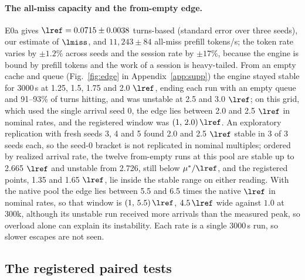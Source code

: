 \paragraph{The all-miss capacity and the from-empty edge.}\label{sec:edge}
E0a gives $\lref=0.0715\pm0.0038$\sps{} turns-based (standard error over three seeds), our estimate of $\lmiss$, and $11{,}243\pm84$ all-miss prefill tokens/s; the token rate varies by $\pm1.2\%$ across seeds and the session rate by $\pm17\%$, because the engine is bound by prefill tokens and the work of a session is heavy-tailed. From an empty cache and queue (Fig.~\ref{fig:edge} in Appendix~\ref{app:supp}) the engine stayed stable for 3000\,s at 1.25, 1.5, 1.75 and 2.0 $\lref$, ending each run with an empty queue and 91--93\% of turns hitting, and was unstable at 2.5 and 3.0 $\lref$; on this grid, which used the single arrival seed 0, the edge lies between 2.0 and 2.5 $\lref$ in nominal rates, and the registered window was $(1,\,2.0)\,\lref$. An exploratory replication with fresh seeds 3, 4 and 5 found 2.0 and 2.5 $\lref$ stable in 3 of 3 seeds each, so the seed-0 bracket is not replicated in nominal multiples; ordered by realized arrival rate, the twelve from-empty runs at this pool are stable up to 2.665 $\lref$ and unstable from 2.726, still below $\mu^*/\lref$, and the registered points, 1.35 and 1.65 $\lref$, lie inside the stable range on either reading. With the native pool the edge lies between 5.5 and 6.5 times the native $\lref$ in nominal rates, so that window is $(1,\,5.5)\,\lref$, $4.5\,\lref$ wide against $1.0$ at 300k, although its unstable run received more arrivals than the measured peak, so overload alone can explain its instability. Each rate is a single 3000\,s run, so slower escapes are not seen.

\subsection{The registered paired tests}\label{sec:e2}

